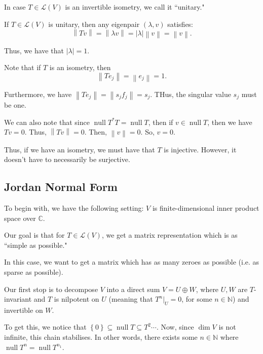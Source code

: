 \documentclass[openany]{book}
\newcommand{\norm}[1]{\left\lVert{#1}\right\rVert}
\newcommand{\CC}{\mathbb{C}}
\newcommand{\NN}{\mathbb{N}}
\DeclareMathOperator*{\vnull}{null}
\begin{document}
In case $T \in \mathcal L(V)$ is an invertible isometry, we call it ``unitary."

\begin{rmk}
	If $T \in \mathcal L(V)$ is unitary, then any eigenpair $(\lambda, v)$ satisfies:
	\begin{equation*}
		\norm{Tv} = \norm{\lambda v} = \lvert \lambda \rvert\norm{v} = \norm{v}.
	\end{equation*}

	Thus, we have that $\lvert \lambda \rvert  = 1$.
\end{rmk}

Note that if $T$ is an isometry, then
\begin{equation*}
	\norm{Te_{j}} = \norm{e_{j}} = 1.
\end{equation*}

Furthermore, we have $\norm{Te_{j}} = \norm{s_{j} f_{j}} = s_{j}$. THus, the singular value $s_{j}$ must be one.

We can also note that since $\vnull T^{*}T = \vnull T$, then if $v \in \vnull T$, then we have $Tv = 0$. Thus, $\norm{Tv} = 0$. Then, $\norm{v} = 0$. So, $v = 0$.

Thus, if we have an isometry, we must have that $T$ is injective. However, it doesn't have to necessarily be surjective.

\subsection{Jordan Normal Form}
To begin with, we have the following setting: $V$ is finite-dimensional inner product space over $\CC$.

Our goal is that for $T \in \mathcal L(V)$, we get a matrix representation which is as ``simple as possible." 

In this case, we want to get a matrix which has as many zeroes as possible (i.e. as sparse as possible).

Our first stop is to decompose $V$ into a direct sum $V = U \oplus W$, where $U,W$ are $T$-invariant and $T$ is nilpotent on $U$ (meaning that $T^{n}\big|_U = 0$, for some $n \in \NN$) and invertible on $W$. 

To get this, we notice that $\left\{  0 \right\} \subseteq \vnull T \subseteq T^{2} \cdots $. Now, since $\dim V$ is not infinite, this chain stabilises. In other words, there exists some $n \in \NN$ where $\vnull T^{n} = \vnull T^{n_{1}}$.
\end{document}

